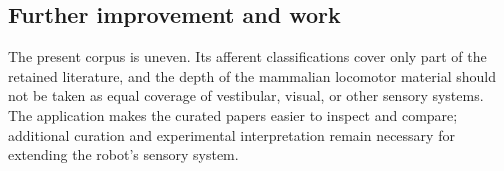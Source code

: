 \subsection{Further improvement and work}

The present corpus is uneven. Its afferent classifications cover only part of the retained literature, and the depth of the mammalian locomotor material should not be taken as equal coverage of vestibular, visual, or other sensory systems. The application makes the curated papers easier to inspect and compare; additional curation and experimental interpretation remain necessary for extending the robot's sensory system.
